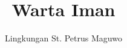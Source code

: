 \documentclass[a5paper,titlepage,11pt,openany]{scrbook}
\author{Lingkungan St. Petrus Maguwo}
\title{Warta Iman}
\begin{document}
\thispagestyle{empty}

\setlength{\parindent}{1cm}
\pagestyle{plain}

\begin{center}
\end{center}







\end{document}
